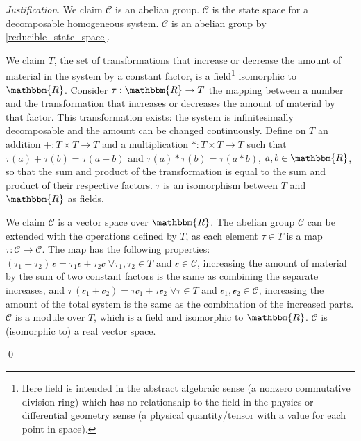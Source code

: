 \documentclass[aps,pra,10pt,twocolumn,floatfix,nofootinbib]{revtex4-1}
\numberwithin{equation}{section}
\theoremstyle{definition}
\newenvironment{justification}{\emph{Justification}.}{\qed}
\begin{document}
\begin{justification}
We claim $\mathcal{C}$ is an abelian group. $\mathcal{C}$ is the state space for a decomposable homogeneous system. $\mathcal{C}$ is an abelian group  by \ref{reducible_state_space}.

We claim $T$, the set of transformations that increase or decrease the amount of material in the system by a constant factor, is a field\footnote{Here field is intended in the abstract algebraic sense (a nonzero commutative division ring) which has no relationship to the field in the physics or differential geometry sense (a physical quantity/tensor with a value for each point in space).} isomorphic to $\mathbbm{R}$. Consider $\tau: \mathbbm{R} \rightarrow T$ the mapping between a number and the transformation that increases or decreases the amount of material by that factor. This transformation exists: the system is infinitesimally decomposable and the amount can be changed continuously. Define on $T$ an addition $+: T \times T \rightarrow T$ and a multiplication $*: T \times T \rightarrow T$ such that $\tau(a) + \tau(b) = \tau(a+b)$ and $\tau(a) * \tau(b) = \tau(a*b)$, $a,b \in \mathbbm{R}$, so that the sum and product of the transformation is equal to the sum and product of their respective factors. $\tau$ is an isomorphism between $T$ and $\mathbbm{R}$ as fields.

We claim $\mathcal{C}$ is a vector space over $\mathbbm{R}$. The abelian group $\mathcal{C}$ can be extended with the operations defined by $T$, as each element $\tau \in T$ is a map $\tau : \mathcal{C} \rightarrow \mathcal{C}$. The map has the following properties: $(\tau_1 + \tau_2) \, \mathcal{c} = \tau_1 \mathcal{c} + \tau_2 \mathcal{c} \; \forall \tau_1, \tau_2 \in T$ and $\mathcal{c} \in \mathcal{C}$, increasing the amount of material by the sum of two constant factors is the same as combining the separate increases, and $\tau \, (\mathcal{c}_1 + \mathcal{c}_2) = \tau \mathcal{c}_1 + \tau \mathcal{c}_2\; \forall \tau \in T$ and $\mathcal{c}_1, \mathcal{c}_2 \in \mathcal{C}$, increasing the amount of the total system is the same as the combination of the increased parts. $\mathcal{C}$ is a module over $T$, which is a field and isomorphic to $\mathbbm{R}$. $\mathcal{C}$ is (isomorphic to) a real vector space.


\end{justification}
\end{document}
